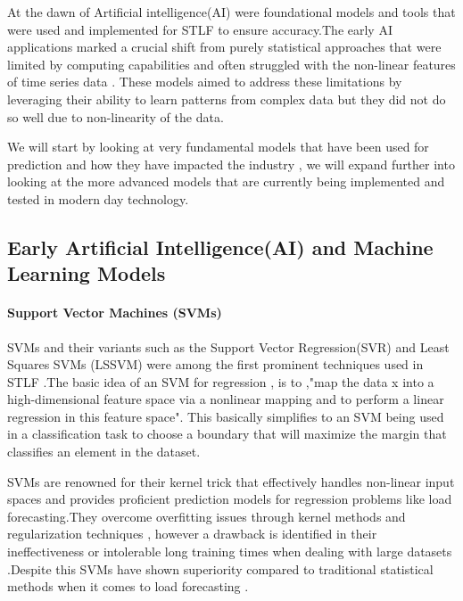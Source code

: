  At the dawn of Artificial intelligence(AI) were foundational models and tools that were used and implemented for STLF to ensure accuracy.The early AI applications marked a crucial shift from purely statistical approaches that were limited by computing capabilities and often struggled with the non-linear features of time series data \cite{wang2018short}. These models aimed to address these limitations by leveraging their ability to learn patterns from complex data but they did not do so well due to non-linearity of the data.
 
 We will start by looking at very fundamental models that have been used for prediction and how they have impacted the industry  , we will expand further into looking at the more advanced models that are currently being implemented and tested in modern day technology.
 
 \subsection{Early Artificial Intelligence(AI) and Machine Learning Models}
 
 \paragraph{Support Vector Machines (SVMs)}

 SVMs  and their variants such as the Support Vector Regression(SVR) and Least Squares SVMs (LSSVM) were among the first prominent techniques used in STLF \cite{wang2018short}.The basic idea of an SVM for regression , is to ,"map the data x into a high-dimensional feature space via a nonlinear
 mapping and to perform a linear regression in this feature space"\cite{mohandes2002support}. This basically simplifies to an SVM being used in a classification task to choose a boundary that will maximize the margin that classifies an element in the dataset.
 
 SVMs are renowned for their kernel trick that effectively handles non-linear input spaces and provides proficient prediction models for regression problems like load forecasting\cite{hussien2021comparative}.They overcome overfitting issues through kernel methods and regularization techniques \cite{hussien2021comparative} , however a drawback is identified in their ineffectiveness or intolerable long training times when dealing with large datasets \cite{dong2017short}.Despite this SVMs have shown superiority compared to traditional statistical methods when it comes to load forecasting \cite{gochhait2023regression}.
 
